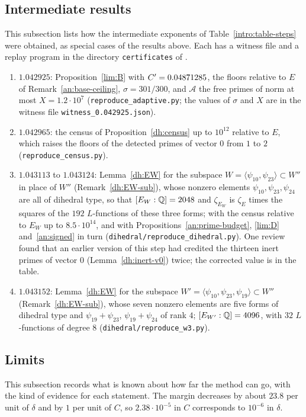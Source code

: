 \subsection{Intermediate results}
This subsection lists how the intermediate exponents of
Table~\ref{intro:table-steps} were obtained, as special cases of the results
above. Each has a witness file and a replay program in the directory
\texttt{certificates} of \cite{NaslundCode4317}.
\begin{enumerate}
\item[(1)] $1.042925$: Proposition~\ref{lim:B} with $C'=0.04871285$, the
 floors relative to $E$ of Remark~\ref{an:base-ceiling}, $\sigma=301/300$, and
 $\mathcal A$ the free primes of norm at most $X=1.2\cdot10^7$
 (\texttt{reproduce\_adaptive.py}; the values of $\sigma$ and $X$ are in the
 witness file \texttt{witness\_0.042925.json}).
\item[(2)] $1.042965$: the census of Proposition~\ref{dh:census} up to
 $10^{12}$ relative to $E$, which raises the floors of the detected primes of
 vector $0$ from $1$ to $2$ (\texttt{reproduce\_census.py}).
\item[(3)] $1.043113$ to $1.043124$: Lemma~\ref{dh:EW} for the subspace
 $W=\langle\psi_{10},\psi_{23}\rangle\subset W''$ in place of $W''$
 (Remark~\ref{dh:EW-sub}), whose nonzero elements
 $\psi_{10},\psi_{23},\psi_{24}$ are all of dihedral type, so that
 $[E_W:\mathbb Q]=2048$ and $\zeta_{E_W}$ is $\zeta_E$ times the squares of the $192$
 $L$-functions of these three forms; with the census relative to $E_W$ up to
 $8.5\cdot10^{14}$, and with Propositions~\ref{an:prime-budget}, \ref{lim:D}
 and~\ref{an:signed} in turn (\texttt{dihedral/reproduce\_dihedral.py}). One
 review found that an earlier version of this step had credited the thirteen
 inert primes of vector $0$ (Lemma~\ref{dh:inert-v0}) twice; the corrected value is in the table.
\item[(4)] $1.043152$: Lemma~\ref{dh:EW} for the subspace
 $W'=\langle\psi_{10},\psi_{23},\psi_{19}\rangle\subset W''$
 (Remark~\ref{dh:EW-sub}), whose seven nonzero elements
 are five forms of dihedral type and $\psi_{19}+\psi_{23}$,
 $\psi_{19}+\psi_{24}$ of rank $4$; $[E_{W'}:\mathbb Q]=4096$, with $32$
 $L$-functions of degree $8$ (\texttt{dihedral/reproduce\_w3.py}).
\end{enumerate}

\subsection{Limits}
This subsection records what is known about how far the method can go, with
the kind of evidence for each statement. The margin decreases by about $23.8$ per unit of $\delta$ and by $1$ per unit
of $C$, so $2.38\cdot10^{-5}$ in $C$ corresponds to $10^{-6}$ in $\delta$.

